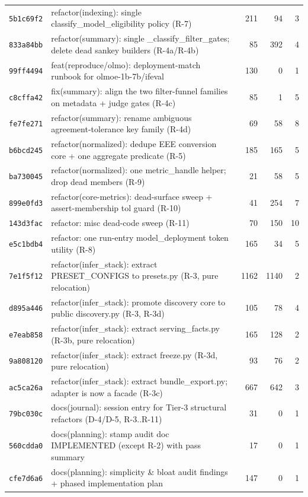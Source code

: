 \begin{longtable}{@{}p{}p{}r r r@{}}
\texttt{5b1c69f2} & refactor(indexing): single classify\_model\_eligibility policy (R-7) & 211 & 94 & 3 \\
\texttt{833a84bb} & refactor(summary): single \_classify\_filter\_gates; delete dead sankey builders (R-4a/R-4b) & 85 & 392 & 4 \\
\texttt{99ff4494} & feat(reproduce/olmo): deployment-match runbook for olmoe-1b-7b/ifeval & 130 & 0 & 1 \\
\texttt{c8cffa42} & fix(summary): align the two filter-funnel families on metadata + judge gates (R-4c) & 85 & 1 & 5 \\
\texttt{fe7fe271} & refactor(summary): rename ambiguous agreement-tolerance key family (R-4d) & 69 & 58 & 8 \\
\texttt{b6bcd245} & refactor(normalized): dedupe EEE conversion core + one aggregate predicate (R-5) & 185 & 165 & 5 \\
\texttt{ba730045} & refactor(normalized): one metric\_handle helper; drop dead members (R-9) & 21 & 58 & 5 \\
\texttt{899e0fd3} & refactor(core-metrics): dead-surface sweep + assert-membership tol guard (R-10) & 41 & 254 & 7 \\
\texttt{143d3fac} & refactor: misc dead-code sweep (R-11) & 70 & 150 & 10 \\
\texttt{e5c1bdb4} & refactor: one run-entry model\_deployment token utility (R-8) & 165 & 34 & 5 \\
\texttt{7e1f5f12} & refactor(infer\_stack): extract PRESET\_CONFIGS to presets.py (R-3, pure relocation) & 1162 & 1140 & 2 \\
\texttt{d895a446} & refactor(infer\_stack): promote discovery core to public discovery.py (R-3, R-3d) & 105 & 78 & 4 \\
\texttt{e7eab858} & refactor(infer\_stack): extract serving\_facts.py (R-3b, pure relocation) & 165 & 128 & 2 \\
\texttt{9a808120} & refactor(infer\_stack): extract freeze.py (R-3d, pure relocation) & 93 & 76 & 2 \\
\texttt{ac5ca26a} & refactor(infer\_stack): extract bundle\_export.py; adapter is now a facade (R-3c) & 667 & 642 & 3 \\
\texttt{79bc030c} & docs(journal): session entry for Tier-3 structural refactors (D-4/D-5, R-3..R-11) & 31 & 0 & 1 \\
\texttt{560cdda0} & docs(planning): stamp audit doc IMPLEMENTED (except R-2) with pass summary & 17 & 0 & 1 \\
\texttt{cfe7d6a6} & docs(planning): simplicity \& bloat audit findings + phased implementation plan & 147 & 0 & 1 \\

\end{longtable}
